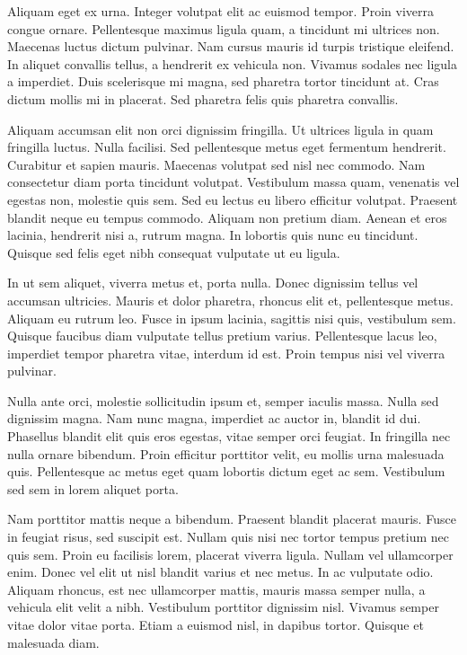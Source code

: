 \documentclass[12pt]{article}
\begin{document}
Aliquam eget ex urna. Integer volutpat elit ac euismod tempor. Proin viverra congue ornare. Pellentesque maximus ligula quam, a tincidunt mi ultrices non. Maecenas luctus dictum pulvinar. Nam cursus mauris id turpis tristique eleifend. In aliquet convallis tellus, a hendrerit ex vehicula non. Vivamus sodales nec ligula a imperdiet. Duis scelerisque mi magna, sed pharetra tortor tincidunt at. Cras dictum mollis mi in placerat. Sed pharetra felis quis pharetra convallis.

Aliquam accumsan elit non orci dignissim fringilla. Ut ultrices ligula in quam fringilla luctus. Nulla facilisi. Sed pellentesque metus eget fermentum hendrerit. Curabitur et sapien mauris. Maecenas volutpat sed nisl nec commodo. Nam consectetur diam porta tincidunt volutpat. Vestibulum massa quam, venenatis vel egestas non, molestie quis sem. Sed eu lectus eu libero efficitur volutpat. Praesent blandit neque eu tempus commodo. Aliquam non pretium diam. Aenean et eros lacinia, hendrerit nisi a, rutrum magna. In lobortis quis nunc eu tincidunt. Quisque sed felis eget nibh consequat vulputate ut eu ligula.

In ut sem aliquet, viverra metus et, porta nulla. Donec dignissim tellus vel accumsan ultricies. Mauris et dolor pharetra, rhoncus elit et, pellentesque metus. Aliquam eu rutrum leo. Fusce in ipsum lacinia, sagittis nisi quis, vestibulum sem. Quisque faucibus diam vulputate tellus pretium varius. Pellentesque lacus leo, imperdiet tempor pharetra vitae, interdum id est. Proin tempus nisi vel viverra pulvinar.

Nulla ante orci, molestie sollicitudin ipsum et, semper iaculis massa. Nulla sed dignissim magna. Nam nunc magna, imperdiet ac auctor in, blandit id dui. Phasellus blandit elit quis eros egestas, vitae semper orci feugiat. In fringilla nec nulla ornare bibendum. Proin efficitur porttitor velit, eu mollis urna malesuada quis. Pellentesque ac metus eget quam lobortis dictum eget ac sem. Vestibulum sed sem in lorem aliquet porta.

Nam porttitor mattis neque a bibendum. Praesent blandit placerat mauris. Fusce in feugiat risus, sed suscipit est. Nullam quis nisi nec tortor tempus pretium nec quis sem. Proin eu facilisis lorem, placerat viverra ligula. Nullam vel ullamcorper enim. Donec vel elit ut nisl blandit varius et nec metus. In ac vulputate odio. Aliquam rhoncus, est nec ullamcorper mattis, mauris massa semper nulla, a vehicula elit velit a nibh. Vestibulum porttitor dignissim nisl. Vivamus semper vitae dolor vitae porta. Etiam a euismod nisl, in dapibus tortor. Quisque et malesuada diam.
\end{document}
